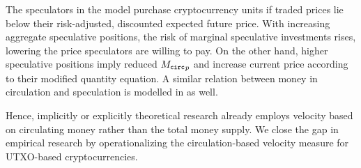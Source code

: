 The speculators in the model purchase cryptocurrency units if traded prices
lie below their risk-adjusted, discounted expected future price.  %
With increasing aggregate speculative positions, the risk of marginal
speculative investments rises, lowering the price speculators are willing to
pay.  %
On the other hand, higher speculative positions imply reduced ${{M_{\mathtt{circ}}}_{p}}$ and
increase current price according to their modified quantity equation.  %
A similar relation between money in circulation and speculation is modelled in
\cite{athey2016bitcoin} as well.  %

Hence, implicitly or explicitly theoretical research already employs velocity
based on circulating money rather than the total money supply.  %
We close the gap in empirical research by operationalizing the
circulation-based velocity measure for UTXO-based cryptocurrencies.  %


